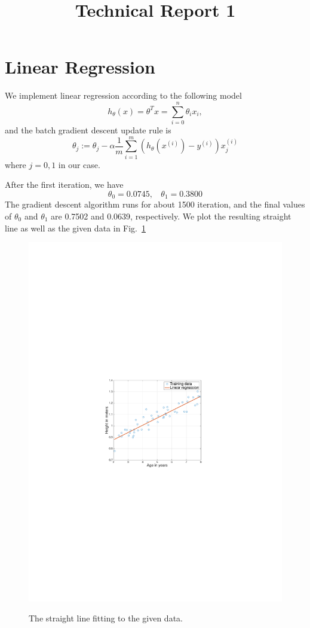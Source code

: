 \documentclass[10pt,a4paper]{article}
\date{}
\begin{document}
\title{Technical Report 1}

\maketitle

\section{Linear Regression}
%
  We implement linear regression according to the following model
  \begin{equation}
    h_{\theta}(x) = \theta^Tx = \sum_{i=0}^n \theta_i x_i, \label{eqn:hypo}
  \end{equation}
  and the batch gradient descent update rule is
  \begin{equation}
    \theta_j := \theta_j - \alpha \frac{1}{m} \sum_{i=1}^m (h_\theta(x^{(i)}) - y^{(i)}) x^{(i)}_j \label{eqn:update}
  \end{equation}
  where $j = 0, 1$ in our case.

  After the first iteration, we have 
  \[ \theta_0 = 0.0745, ~~~~ \theta_1 = 0.3800\]
  The gradient descent algorithm runs for about 1500 iteration, and the final values of $\theta_0$ and $\theta_1$ are 0.7502 and 0.0639, respectively. We plot the resulting straight line as well as the given data in Fig.~\ref{fig:lr}
  \begin{figure}[htb!]
  \centering
    \includegraphics[width=.55\columnwidth]{lab1_lr} \\ %
  \caption{The straight line fitting to the given data.}
  \label{fig:lr}
  \end{figure}
\end{document}
